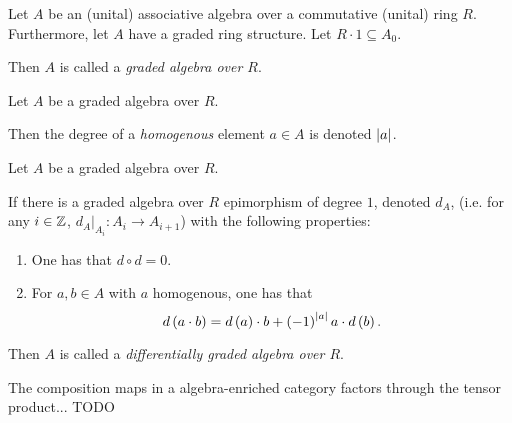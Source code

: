 \begin{definition}
    Let \( A \) be an (unital) associative algebra over a commutative (unital) ring \( R \). Furthermore, let \( A \) have a graded ring structure. Let \( R \cdot 1 \subseteq A_0 \).

    Then \( A \) is called a \emph{graded algebra over \( R \)}.
\end{definition}

\begin{notation}
    Let \( A \) be a graded algebra over \( R \).

    Then the degree of a \emph{homogenous} element \( a \in A \) is denoted \emph{\( \lvert a \rvert \)}.
\end{notation}

\begin{definition}
    Let \( A \) be a graded algebra over \( R \).

    If there is a graded algebra over \( R \) epimorphism of degree \( 1 \), denoted \( d_A \), (i.e. for any \( i \in {\mathbb{Z}} \), \( d_A |_{A_i}: A_i \to A_{i + 1} \))
    with the following properties:
    \begin{enumerate}
        \item One has that \( d \circ d = 0 \).
        \item {
            For \( a, b \in A \) with \( a \) homogenous, one has that
            \[
                d\left( a \cdot b \right)
                =
                d\left( a \right) \cdot b + \left( -1 \right)^{\lvert a \rvert}a \cdot d\left( b \right).
            \]
            }
    \end{enumerate}

    Then \( A \) is called a \emph{differentially graded algebra over \( R \)}.
\end{definition}

\begin{remark}
    The composition maps in a algebra-enriched category factors through the tensor product... TODO
\end{remark}

